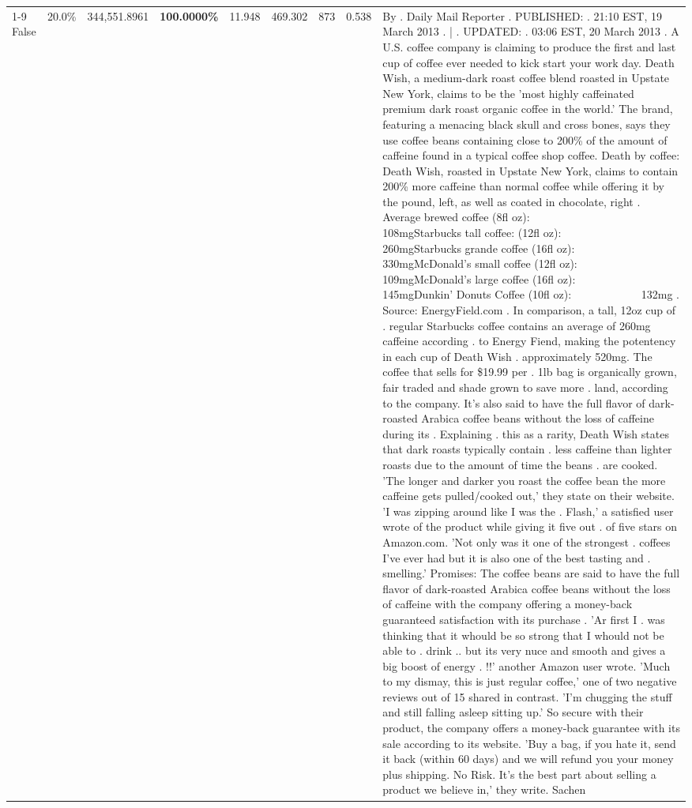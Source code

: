 \begin{table}[H]
{\begin{tabular}{lllrlllll}
\cline{1-9}
False & 20.0\% & 344,551.8961 & \bfseries \color{red} 100.0000\% & 11.948 & 469.302 & 873 & 0.538 & By . Daily Mail Reporter . PUBLISHED: . 21:10 EST, 19 March 2013 . | . UPDATED: . 03:06 EST, 20 March 2013 . A U.S. coffee company is claiming to produce the first and last cup of coffee ever needed to kick start your work day. Death Wish, a medium-dark roast coffee blend roasted in Upstate New York, claims to be the 'most highly caffeinated premium dark roast organic coffee in the world.' The brand, featuring a menacing black skull and cross bones, says they use coffee beans containing close to 200\% of the amount of caffeine found in a typical coffee shop coffee. Death by coffee: Death Wish, roasted in Upstate New York, claims to contain 200\% more caffeine than normal coffee while offering it by the pound, left, as well as coated in chocolate, right . Average brewed coffee (8fl oz):              108mgStarbucks tall coffee: (12fl oz):                260mgStarbucks grande coffee (16fl oz):         330mgMcDonald's small coffee (12fl oz):           109mgMcDonald's large coffee (16fl oz):           145mgDunkin' Donuts Coffee (10fl oz):             132mg . Source: EnergyField.com . In comparison, a tall, 12oz cup of . regular Starbucks coffee contains an average of 260mg caffeine according . to Energy Fiend, making the potentency in each cup of Death Wish . approximately 520mg. The coffee that sells for \$19.99 per . 1lb bag is organically grown, fair traded and shade grown to save more . land, according to the company. It's also said to have the full flavor of dark-roasted Arabica coffee beans without the loss of caffeine during its . Explaining . this as a rarity, Death Wish states that dark roasts typically contain . less caffeine than lighter roasts due to the amount of time the beans . are cooked. 'The longer and darker you roast the coffee bean the more caffeine gets pulled/cooked out,' they state on their website. 'I was zipping around like I was the . Flash,' a satisfied user wrote of the product while giving it five out . of five stars on Amazon.com. 'Not only was it one of the strongest . coffees I've ever had but it is also one of the best tasting and . smelling.’ Promises: The coffee beans are said to have the full flavor of dark-roasted Arabica coffee beans without the loss of caffeine with the company offering a money-back guaranteed satisfaction with its purchase . 'Ar first I . was thinking that it whould be so strong that I whould not be able to . drink .. but its very nuce and smooth and gives a big boost of energy . !!' another Amazon user wrote. 'Much to my dismay, this is just regular coffee,' one of two negative reviews out of 15 shared in contrast. 'I'm chugging the stuff and still falling asleep sitting up.' So secure with their product, the company offers a money-back guarantee with its sale according to its website. 'Buy a bag, if you hate it, send it back (within 60 days) and we will refund you your money plus shipping. No Risk. It’s the best part about selling a product we believe in,' they write. Sachen \\

\end{tabular}}
\end{table}
